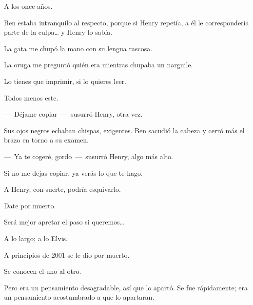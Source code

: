 \sk
A los once años. 

\sk
Ben estaba intranquilo al respecto, porque
si Henry repetía, a él le correspondería parte de la
culpa\ldots{} y Henry lo sabía.

\sk
La gata me chupó la mano con su lengua rascosa. 

\sk
La oruga me preguntó quién era mientras chupaba un narguile. 

\sk
Lo tienes que imprimir, si lo quieres leer. 

\sk
Todos menos este. 

\sk
---~Déjame copiar~---~susurró Henry, otra vez.

Sus ojos negros echaban chispas, exigentes.
Ben sacudió la cabeza y cerró más el brazo en
torno a su examen.

---~Ya te cogeré, gordo~---~susurró Henry, algo
más alto.




\sk
Si no me dejas copiar, ya verás lo que te
hago.

\sk
A Henry, con suerte, podría esquivarlo. 

\sk
Date por muerto. 

\sk
Será mejor apretar el paso si queremos\ldots{} 

\sk
A lo largo; a lo Elvis.\nb{}

\sk
A principios de 2001 se le dio por muerto.  

\sk
Se conocen el uno al otro. 

\sk
Pero era un pensamiento desagradable, así que
lo apartó. Se fue rápidamente; era un pensamiento
acostumbrado a que lo apartaran.

